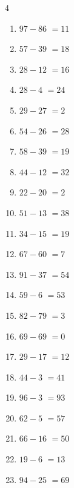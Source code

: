 \begin{multicols}{4}
\begin{enumerate}
  \item $97-86$
        $=11$

  \item $57-39$
        $=18$

  \item $28-12$
        $=16$

  \item $28-4$
        $=24$

  \item $29-27$
        $=2$

  \item $54-26$
        $=28$

  \item $58-39$
        $=19$

  \item $44-12$
        $=32$

  \item $22-20$
        $=2$

  \item $51-13$
        $=38$

  \item $34-15$
        $=19$

\columnbreak %

\resetques

  \item $67-60$
        $=7$

  \item $91-37$
        $=54$

  \item $59-6$
        $=53$

  \item $82-79$
        $=3$

  \item $69-69$
        $=0$

  \item $29-17$
        $=12$

  \item $44-3$
        $=41$

  \item $96-3$
        $=93$

  \item $62-5$
        $=57$

  \item $66-16$
        $=50$

  \item $19-6$
        $=13$

  \item $94-25$
        $=69$


\end{enumerate}
\end{multicols}

